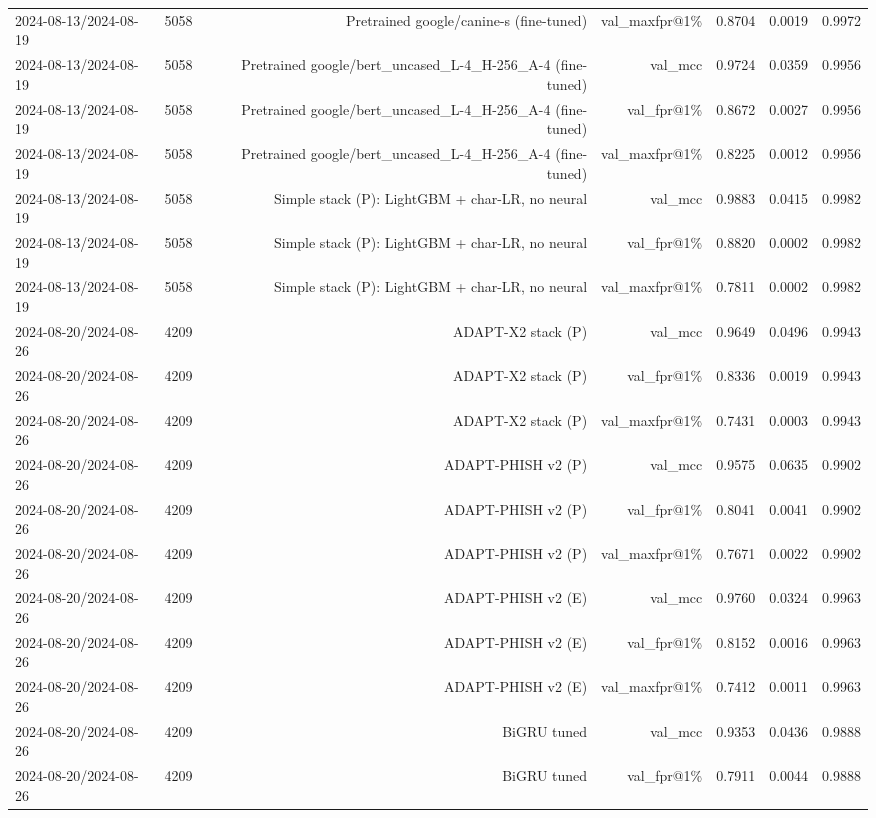 \begin{table}[t]
\begin{tabular}{llrrrrr}
2024-08-13/2024-08-19 & 5058 & Pretrained google/canine-s (fine-tuned) & val\_maxfpr@1\% & 0.8704 & 0.0019 & 0.9972 \\
2024-08-13/2024-08-19 & 5058 & Pretrained google/bert\_uncased\_L-4\_H-256\_A-4 (fine-tuned) & val\_mcc & 0.9724 & 0.0359 & 0.9956 \\
2024-08-13/2024-08-19 & 5058 & Pretrained google/bert\_uncased\_L-4\_H-256\_A-4 (fine-tuned) & val\_fpr@1\% & 0.8672 & 0.0027 & 0.9956 \\
2024-08-13/2024-08-19 & 5058 & Pretrained google/bert\_uncased\_L-4\_H-256\_A-4 (fine-tuned) & val\_maxfpr@1\% & 0.8225 & 0.0012 & 0.9956 \\
2024-08-13/2024-08-19 & 5058 & Simple stack (P): LightGBM + char-LR, no neural & val\_mcc & 0.9883 & 0.0415 & 0.9982 \\
2024-08-13/2024-08-19 & 5058 & Simple stack (P): LightGBM + char-LR, no neural & val\_fpr@1\% & 0.8820 & 0.0002 & 0.9982 \\
2024-08-13/2024-08-19 & 5058 & Simple stack (P): LightGBM + char-LR, no neural & val\_maxfpr@1\% & 0.7811 & 0.0002 & 0.9982 \\
2024-08-20/2024-08-26 & 4209 & ADAPT-X2 stack (P) & val\_mcc & 0.9649 & 0.0496 & 0.9943 \\
2024-08-20/2024-08-26 & 4209 & ADAPT-X2 stack (P) & val\_fpr@1\% & 0.8336 & 0.0019 & 0.9943 \\
2024-08-20/2024-08-26 & 4209 & ADAPT-X2 stack (P) & val\_maxfpr@1\% & 0.7431 & 0.0003 & 0.9943 \\
2024-08-20/2024-08-26 & 4209 & ADAPT-PHISH v2 (P) & val\_mcc & 0.9575 & 0.0635 & 0.9902 \\
2024-08-20/2024-08-26 & 4209 & ADAPT-PHISH v2 (P) & val\_fpr@1\% & 0.8041 & 0.0041 & 0.9902 \\
2024-08-20/2024-08-26 & 4209 & ADAPT-PHISH v2 (P) & val\_maxfpr@1\% & 0.7671 & 0.0022 & 0.9902 \\
2024-08-20/2024-08-26 & 4209 & ADAPT-PHISH v2 (E) & val\_mcc & 0.9760 & 0.0324 & 0.9963 \\
2024-08-20/2024-08-26 & 4209 & ADAPT-PHISH v2 (E) & val\_fpr@1\% & 0.8152 & 0.0016 & 0.9963 \\
2024-08-20/2024-08-26 & 4209 & ADAPT-PHISH v2 (E) & val\_maxfpr@1\% & 0.7412 & 0.0011 & 0.9963 \\
2024-08-20/2024-08-26 & 4209 & BiGRU tuned & val\_mcc & 0.9353 & 0.0436 & 0.9888 \\
2024-08-20/2024-08-26 & 4209 & BiGRU tuned & val\_fpr@1\% & 0.7911 & 0.0044 & 0.9888 \\

\end{tabular}
\end{table}
